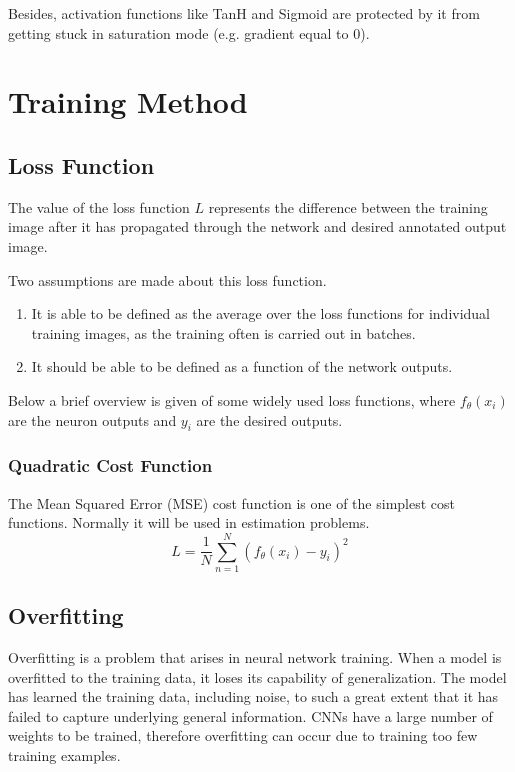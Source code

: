    Besides, activation functions like TanH and Sigmoid are protected by it from getting stuck in saturation mode (e.g. gradient equal to $0$).

    \section{Training Method}
    \label{training}
    \subsection{Loss Function}
    The value of the loss function $L$ represents the difference between the training image after it has propagated through the network and desired annotated output image.

    Two assumptions are made about this loss function. 
    \begin{enumerate}
        \item It is able to be defined as the average over the loss functions for individual training images, as the training often is carried out in batches.
        \item It should be able to be defined as a function of the network outputs. 
    \end{enumerate}

    Below a brief overview is given of some widely used loss functions, where $f_{\theta}(x_i)$ are the neuron outputs and $y_i$ are the desired outputs.
    \subsubsection{Quadratic Cost Function}
    The Mean Squared Error (MSE) cost function is one of the simplest cost functions. Normally it will be used in estimation problems\cite{boureau2008sparse}.
    \begin{equation}
        L =\frac{1}{N}\sum_{n=1}^{N}(f_{\theta}(x_i) - y_i)^2
        \label{eq:mse}
    \end{equation}


    \subsection{Overfitting}
    Overfitting is a problem that arises in neural network training. When a model is overfitted to the training data, it loses its capability of generalization. The model has learned the training data, including noise, to such a great extent that it has failed to capture underlying general information. CNNs have a large number of weights to be trained, therefore overfitting can occur due to training too few training examples.

